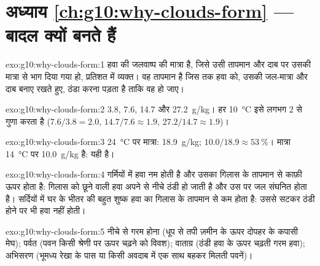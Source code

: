 \section*{अध्याय \ref{ch:g10:why-clouds-form} --- बादल क्यों बनते हैं}

\begin{solution}{exo:g10:why-clouds-form:1}
 हवा की जलवाष्प की मात्रा है, जिसे उसी तापमान और दाब पर उसकी
 मात्रा से भाग दिया गया हो, प्रतिशत में व्यक्त।
 वह तापमान है जिस तक हवा को, उसकी जल-मात्रा और दाब बनाए रखते हुए,
ठंडा करना पड़ता है ताकि वह  हो जाए।
\end{solution}

\begin{solution}{exo:g10:why-clouds-form:2}
\num{3.8}, \num{7.6}, \num{14.7} और \qty{27.2}{g/kg}। हर
\qty{10}{\degreeCelsius} इसे लगभग 2 से गुणा करता है ($7.6/3.8 = 2.0$,
$14.7/7.6 \approx 1.9$, $27.2/14.7 \approx 1.9$)।
\end{solution}

\begin{solution}{exo:g10:why-clouds-form:3}
\qty{24}{\degreeCelsius} पर  मात्रा: \qty{18.9}{g/kg};  $10.0/18.9 \approx \qty{53}{\percent}$।  मात्रा
\qty{14}{\degreeCelsius} पर \qty{10.0}{g/kg} है: यही  है।
\end{solution}

\begin{solution}{exo:g10:why-clouds-form:4}
गर्मियों में हवा नम होती है और उसका  गिलास के तापमान से काफ़ी ऊपर होता है:
गिलास को छूने वाली हवा अपने  से नीचे ठंडी हो जाती है और उस पर जल संघनित होता
है। सर्दियों में घर के भीतर की बहुत शुष्क हवा का  गिलास के तापमान से कम होता है:
उससे सटकर ठंडी होने पर भी हवा
 नहीं होती।
\end{solution}

\begin{solution}{exo:g10:why-clouds-form:5}
नीचे से गरम होना (धूप से तपी ज़मीन के ऊपर दोपहर के कपासी मेघ); पर्वत (पवन
किसी श्रेणी पर ऊपर चढ़ने को विवश); वाताग्र (ठंडी हवा के ऊपर चढ़ती गरम हवा); अभिसरण
(भूमध्य रेखा के पास या किसी अवदाब में एक साथ बहकर मिलती पवनें)।
\end{solution}

